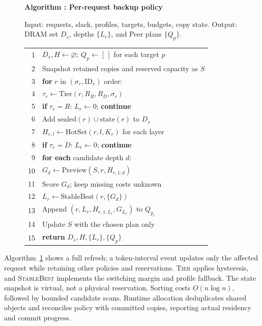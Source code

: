 \begin{figure}[t]
  \raggedright
  \label{alg:placement}
  \noindent\textbf{Algorithm \thedesignalgorithm: Per-request backup policy}
  \par\smallskip
  \noindent Input: requests, slack, profiles, targets, budgets, copy state.
  Output: DRAM set $D_s$, depths $\{L_r\}$, and Peer plans $\{Q_p\}$.
  \par\smallskip
  \begin{tabularx}{\columnwidth}{@{}r@{\quad}X@{}}
    \toprule
    1 & $D_s,H\gets\varnothing$; $Q_p\gets[\,]$ for each target $p$ \\
    2 & Snapshot retained copies and reserved capacity as $S$ \\
    3 & \textbf{for} $r$ in $(\sigma_r,\mathrm{ID}_r)$ order: \\
    4 & \quad$\tau_r\gets\mathrm{Tier}(r,R_R,R_D,\sigma_r)$ \\
    5 & \quad\textbf{if} $\tau_r=R$: $L_r\gets0$; \textbf{continue} \\
    6 & \quad Add $\mathrm{sealed}(r)\cup\mathrm{state}(r)$ to $D_s$ \\
    7 & \quad$H_{r,l}\gets\mathrm{HotSet}(r,l,K_r)$ for each layer \\
    8 & \quad\textbf{if} $\tau_r=D$: $L_r\gets0$; \textbf{continue} \\
    9 & \quad\textbf{for each} candidate depth $d$: \\
    10 & \qquad$G_d\gets\mathrm{Preview}(S,r,H_{r,1:d})$ \\
    11 & \qquad Score $G_d$; keep missing costs unknown \\
    12 & \quad$L_r\gets\mathrm{StableBest}(r,\{G_d\})$ \\
    13 & \quad Append $(r,L_r,H_{r,1:L_r},G_{L_r})$ to $Q_{p_r}$ \\
    14 & \quad Update $S$ with the chosen plan only \\
    15 & \textbf{return} $D_s,H,\{L_r\},\{Q_p\}$ \\
    \bottomrule
  \end{tabularx}
\end{figure}

Algorithm~\ref{alg:placement} shows a full refresh; a token-interval
event updates only the affected request while retaining other policies
and reservations. \textsc{Tier} applies hysteresis, and
\textsc{StableBest} implements the switching margin and profile fallback.
The state snapshot is virtual, not a physical reservation.
Sorting costs $O(n\log n)$, followed by bounded candidate scans.
Runtime allocation deduplicates shared objects and reconciles policy
with committed copies, reporting actual residency and commit progress.

